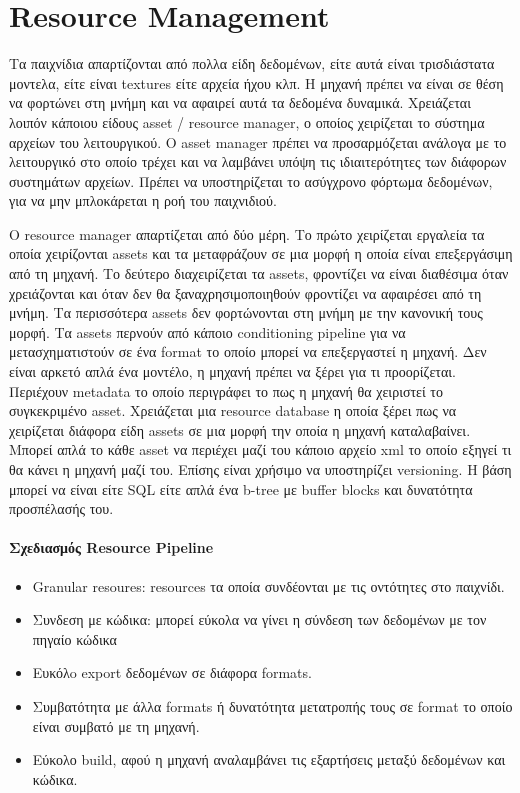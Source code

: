 \section{Resource Management}
Τα παιχνίδια απαρτίζονται από πολλα είδη δεδομένων, είτε αυτά είναι τρισδιάστατα μοντελα, είτε είναι textures είτε αρχεία ήχου κλπ. Η μηχανή πρέπει να είναι σε θέση να φορτώνει στη μνήμη και να αφαιρεί αυτά τα δεδομένα δυναμικά. Χρειάζεται λοιπόν κάποιου είδους asset / resource manager, ο οποίος χειρίζεται το σύστημα αρχείων του λειτουργικού. Ο asset manager πρέπει να προσαρμόζεται ανάλογα με το λειτουργικό στο οποίο τρέχει και να λαμβάνει υπόψη τις ιδιαιτερότητες των διάφορων συστημάτων αρχείων. Πρέπει να υποστηρίζεται το ασύγχρονο φόρτωμα δεδομένων, για να μην μπλοκάρεται η ροή του παιχνιδιού.

Ο resource manager απαρτίζεται από δύο μέρη. Το πρώτο χειρίζεται εργαλεία τα οποία χειρίζονται assets και τα μεταφράζουν σε μια μορφή η οποία είναι επεξεργάσιμη από τη μηχανή. Το δεύτερο διαχειρίζεται τα assets, φροντίζει να είναι διαθέσιμα όταν χρειάζονται  και όταν δεν θα ξαναχρησιμοποιηθούν φροντίζει να αφαιρέσει από τη μνήμη.
Τα περισσότερα assets δεν φορτώνονται στη μνήμη με την κανονική τους μορφή. Τα assets περνούν από κάποιο conditioning pipeline για να μετασχηματιστούν σε ένα format το οποίο μπορεί να επεξεργαστεί η μηχανή. Δεν είναι αρκετό απλά ένα μοντέλο, η μηχανή πρέπει να ξέρει για τι προορίζεται. Περιέχουν metadata το οποίο περιγράφει το πως η μηχανή θα χειριστεί το συγκεκριμένο asset. 
Χρειάζεται μια resource database η οποία ξέρει πως να χειρίζεται διάφορα είδη assets σε μια μορφή την οποία η μηχανή καταλαβαίνει. Μπορεί απλά το κάθε asset να περιέχει μαζί του κάποιο αρχείο xml το οποίο εξηγεί τι θα κάνει η μηχανή μαζί του. Επίσης είναι χρήσιμο να υποστηρίζει  versioning. Η βάση μπορεί να είναι είτε SQL είτε απλά ένα b-tree με buffer blocks και δυνατότητα προσπέλασής του. 

\paragraph{Σχεδιασμός Resource Pipeline}
\begin{itemize}
\item Granular resoures:  resources τα οποία συνδέονται με τις οντότητες στο παιχνίδι. 
\item Συνδεση με κώδικα: μπορεί εύκολα να γίνει η σύνδεση των δεδομένων με τον πηγαίο κώδικα
\item Ευκόλo export δεδομένων σε διάφορα formats.
\item Συμβατότητα με άλλα formats ή δυνατότητα μετατροπής τους σε format το οποίο είναι συμβατό με τη μηχανή.
\item Εύκολο build, αφού η μηχανή αναλαμβάνει τις εξαρτήσεις μεταξύ δεδομένων και κώδικα.
\end{itemize}

